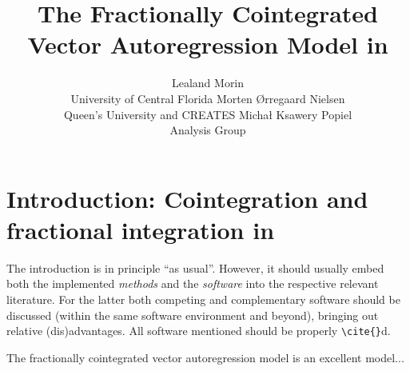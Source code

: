 \documentclass[article]{jss}
\author{Lealand Morin\\University of Central Florida
   \And Morten \O rregaard Nielsen\\Queen's University and CREATES
   \AND Micha\l{} Ksawery Popiel\\Analysis Group}
\title{The Fractionally Cointegrated Vector Autoregression Model in \proglang{R}}
\begin{document}


\section[Introduction: Cointegration and fractional integration in R]{Introduction: Cointegration and fractional integration in } \label{sec:intro}

\begin{leftbar}
The introduction is in principle ``as usual''. However, it should usually embed
both the implemented \emph{methods} and the \emph{software} into the respective
relevant literature. For the latter both competing and complementary software
should be discussed (within the same software environment and beyond), bringing
out relative (dis)advantages. All software mentioned should be properly
\verb|\cite{}|d. 
%
\end{leftbar}

The fractionally cointegrated vector autoregression model is an excellent model...





\end{document}
